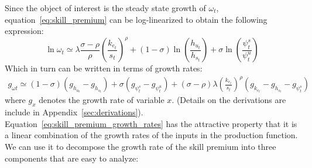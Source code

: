 \documentclass[12pt]{article}
\begin{document}
Since the object of interest is the steady state growth of $\omega_t$, equation~\eqref{eq:skill_premium} can be log-linearized to obtain the following expression:
\begin{equation}\label{eq:skill_premium_log_linear}
 \ln \omega_{t} \simeq \lambda \frac{\sigma-\rho}{\rho}\left(\frac{k_{e_t}}{s_{t}}\right)^{\rho}+(1-\sigma) \ln \left(\frac{h_{u_t}}{h_{s_t}}\right)+\sigma \ln \left(\frac{\psi^s_t}{\psi^u_t}\right)
\end{equation}
Which in turn can be written in terms of growth rates:
\begin{equation}\label{eq:skill_premium_growth_rates}
 \begin{aligned}
 g_{\omega t} \simeq (1-\sigma)\left(g_{h_{u_t}}-g_{h_{s_t}}\right)+\sigma\left(g_{\psi^s_t}-g_{\psi^u_t}\right) 
 +(\sigma-\rho) \lambda\left(\frac{k_{e_t}}{s_{t}}\right)^{\rho}\left(g_{k_{e_t}}-g_{h_{s_t}}-g_{\psi^s_t}\right) 
 \end{aligned}
\end{equation}
where $g_x$ denotes the growth rate of variable $x$. (Details on the derivations are include in Appendix~\ref{sec:derivations}). Equation~\eqref{eq:skill_premium_growth_rates} has the attractive property that it is a linear combination of the growth rates of the inputs in the production function. We can use it to decompose the growth rate of the skill premium into three components that are easy to analyze:
\end{document}

